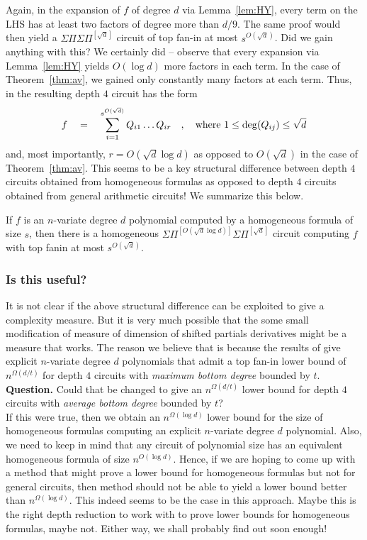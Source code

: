 \documentclass[12pt]{report}
\newcommand{\SPSPfanin}[2]{\Sigma\Pi^{[#1]}\Sigma\Pi^{[#2]}}
\begin{document}
Again, in the expansion of $f$ of degree $d$ via Lemma~\ref{lem:HY}, every term on the LHS has at least two factors of degree more than $d/9$. The same proof would then yield a $\Sigma\Pi\Sigma\Pi^{[\sqrt{d}]}$ circuit of top fan-in at most $s^{O(\sqrt{d})}$. Did we gain anything with this? We certainly did -- observe that every expansion via Lemma~\ref{lem:HY} yields $O(\log d)$ more factors in each term. In the case of Theorem~\ref{thm:av}, we gained only constantly many factors at each term. Thus, in the resulting depth $4$ circuit has the form
\[
f \quad = \quad \sum_{i=1}^{s^{O(\sqrt{d})}} Q_{i1} \dots Q_{ir}\quad , \quad\text{where $1\leq \deg(Q_{ij})\leq \sqrt{d}$}
\]
and, most importantly, $r = O(\sqrt{d}\log d)$ as opposed to $O(\sqrt{d})$ in the case of Theorem~\ref{thm:av}. This seems to be a key structural difference between depth $4$ circuits obtained from homogeneous formulas as opposed to depth $4$ circuits obtained from general arithmetic circuits! We summarize this below. 

\begin{theorem}
If $f$ is an $n$-variate degree $d$ polynomial computed by a homogeneous formula of size $s$, then there is a homogeneous $\SPSPfanin{O(\sqrt{d}\log d)}{\sqrt{d}}$ circuit computing $f$ with top fanin at most $s^{O(\sqrt{d})}$. 
\end{theorem}

\subsubsection*{Is this useful?}

It is not clear if the above structural difference can be exploited to give a complexity measure. But it is very much possible that the some small modification of measure of dimension of shifted partials derivatives might be a measure that works. The reason we believe that is because the results of \cite{gkks13,KSS13,KS14a} give explicit $n$-variate degree $d$ polynomials that admit a top fan-in lower bound of $n^{\Omega(d/t)}$ for depth $4$ circuits with \emph{maximum bottom degree} bounded by $t$. \\

{\bf Question. }Could that be changed to give an $n^{\Omega(d/t)}$ lower bound for depth $4$ circuits with \emph{average bottom degree} bounded by $t$? \\

If this were true, then we obtain an $n^{\Omega(\log d)}$ lower bound for the size of homogeneous formulas computing an explicit $n$-variate degree $d$ polynomial. Also, we need to keep in mind that any circuit of polynomial size has an equivalent homogeneous formula of size $n^{O(\log d)}$. Hence, if we are hoping to come up with a method that might prove a lower bound for homogeneous formulas but not for general circuits, then method should not be able to yield a lower bound better than $n^{\Omega(\log d)}$. This indeed seems to be the case in this approach. Maybe this is the right depth reduction to work with to prove lower bounds for homogeneous formulas, maybe not. Either way, we shall probably find out soon enough!
\end{document}
